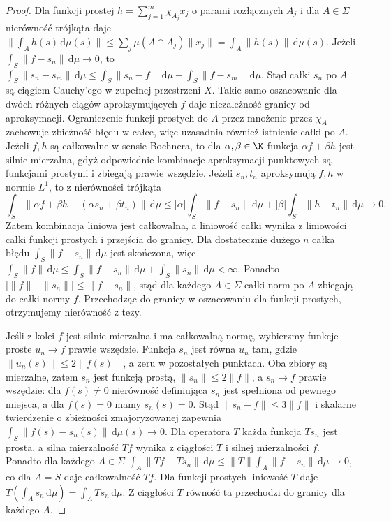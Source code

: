 \begin{proof}
Dla funkcji prostej $h=\sum_{j=1}^m\chi_{A_j}x_j$
o parami rozłącznych $A_j$ i dla $A\in\Sigma$ nierówność
trójkąta daje
$\|\int_A h(s)\,\mathrm d\mu(s)\|
\le\sum_j\mu(A\cap A_j)\|x_j\|
=\int_A\|h(s)\|\,\mathrm d\mu(s)$.
Jeżeli $\int_S\|f-s_n\|\,\mathrm d\mu\to0$, to
$\int_S\|s_n-s_m\|\,\mathrm d\mu\le
\int_S\|s_n-f\|\,\mathrm d\mu+\int_S\|f-s_m\|\,\mathrm d\mu$.
Stąd całki $s_n$ po $A$ są ciągiem Cauchy'ego w zupełnej
przestrzeni $X$. Takie samo oszacowanie dla dwóch różnych
ciągów aproksymujących $f$ daje niezależność granicy od
aproksymacji. Ograniczenie funkcji prostych do $A$ przez
mnożenie przez $\chi_A$ zachowuje zbieżność błędu w całce,
więc uzasadnia również istnienie całki po $A$.
Jeżeli $f,h$ są całkowalne w sensie Bochnera, to
dla $\alpha,\beta\in\K$ funkcja $\alpha f+\beta h$ jest silnie mierzalna, gdyż odpowiednie
kombinacje aproksymacji punktowych są funkcjami prostymi
i zbiegają prawie wszędzie. Jeżeli $s_n,t_n$ aproksymują
$f,h$ w normie $L^1$, to z nierówności trójkąta
\[
 \int_S\|\alpha f+\beta h-(\alpha s_n+\beta t_n)\|\,\mathrm d\mu
 \le|\alpha|\int_S\|f-s_n\|\,\mathrm d\mu
 +|\beta|\int_S\|h-t_n\|\,\mathrm d\mu\to0.
\]
Zatem kombinacja liniowa jest całkowalna, a liniowość
całki wynika z liniowości całki funkcji prostych i przejścia
do granicy. Dla dostatecznie dużego $n$ całka błędu
$\int_S\|f-s_n\|\,\mathrm d\mu$ jest skończona, więc
$\int_S\|f\|\,\mathrm d\mu\le\int_S\|f-s_n\|\,\mathrm d\mu+
\int_S\|s_n\|\,\mathrm d\mu<\infty$.
Ponadto $|\|f\|-\|s_n\||\le\|f-s_n\|$, stąd dla każdego
$A\in\Sigma$ całki norm po $A$ zbiegają do całki normy $f$.
Przechodząc do granicy w oszacowaniu dla funkcji prostych,
otrzymujemy nierówność z tezy.

Jeśli z kolei $f$ jest silnie mierzalna i ma całkowalną normę,
wybierzmy funkcje proste $u_n\to f$ prawie wszędzie.
Funkcja $s_n$ jest równa $u_n$ tam, gdzie
$\|u_n(s)\|\le2\|f(s)\|$, a zeru w pozostałych punktach.
Oba zbiory są mierzalne, zatem $s_n$ jest funkcją prostą,
$\|s_n\|\le2\|f\|$, a $s_n\to f$ prawie wszędzie:
dla $f(s)\ne0$ nierówność definiująca $s_n$ jest
spełniona od pewnego miejsca, a dla $f(s)=0$ mamy
$s_n(s)=0$. Stąd $\|s_n-f\|\le3\|f\|$ i skalarne
twierdzenie o zbieżności zmajoryzowanej zapewnia
$\int_S\|f(s)-s_n(s)\|\,\mathrm d\mu(s)\to0$.
Dla operatora $T$ każda funkcja $Ts_n$ jest prosta,
a silna mierzalność $Tf$ wynika z ciągłości $T$ i silnej
mierzalności $f$. Ponadto dla każdego $A\in\Sigma$
$\int_A\|Tf-Ts_n\|\,\mathrm d\mu\le
\|T\|\int_A\|f-s_n\|\,\mathrm d\mu\to0$, co dla $A=S$
daje całkowalność $Tf$. Dla funkcji prostych liniowość
$T$ daje $T(\int_A s_n\,\mathrm d\mu)=\int_A Ts_n\,\mathrm d\mu$.
Z ciągłości $T$ równość ta przechodzi do granicy dla każdego $A$.
\end{proof}

